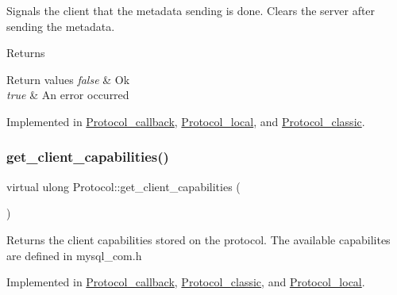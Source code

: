 Signals the client that the metadata sending is done. Clears the server after sending the metadata.

\begin{DoxyReturn}{Returns}

\end{DoxyReturn}

\begin{DoxyRetVals}{Return values}
{\em false} & Ok \\
\hline
{\em true} & An error occurred \\
\hline
\end{DoxyRetVals}


Implemented in \mbox{\hyperlink{classProtocol__callback_a5df97b8f8dbf62682cfc4e79b76ae1ea}{Protocol\+\_\+callback}}, \mbox{\hyperlink{classProtocol__local_adc7012afe880218e2903dac0a22f0f8c}{Protocol\+\_\+local}}, and \mbox{\hyperlink{classProtocol__classic_a1183e18916adea57032a957a99aaee4b}{Protocol\+\_\+classic}}.

\mbox{\label{classProtocol_afc5e8ccb3c29f4b78f7f68cf00b6a713}} 
\subsubsection{\texorpdfstring{get\+\_\+client\+\_\+capabilities()}{get\_client\_capabilities()}}
{\footnotesize\ttfamily virtual ulong Protocol\+::get\+\_\+client\+\_\+capabilities (\begin{DoxyParamCaption}{ }\end{DoxyParamCaption})\hspace{0.3cm}{\ttfamily [pure virtual]}}

Returns the client capabilities stored on the protocol. The available capabilites are defined in mysql\+\_\+com.\+h 

Implemented in \mbox{\hyperlink{classProtocol__callback_af675b178de4d07c875e50db63ce751e4}{Protocol\+\_\+callback}}, \mbox{\hyperlink{classProtocol__classic_aa6779b7a3f3b57f592743b031bbd8eb3}{Protocol\+\_\+classic}}, and \mbox{\hyperlink{classProtocol__local_a9b6d4b8d61490809b99080455b359189}{Protocol\+\_\+local}}.

\mbox{\label{classProtocol_a636debc9b25f4e60864902cdd1b3e87a}} 
